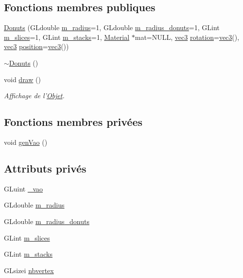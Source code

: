 \subsection*{Fonctions membres publiques}
\begin{DoxyCompactItemize}
\item 
\hyperlink{class_donuts_a91d8d9b011ed1f7e406a2906f2b6e898}{Donuts} (G\+Ldouble \hyperlink{class_donuts_ae3db8d4ea17228ed43d388bac7fb35b3}{m\+\_\+radius}=1, G\+Ldouble \hyperlink{class_donuts_a5050c790a74b5313a06b818a7f3e8723}{m\+\_\+radius\+\_\+donuts}=1, G\+Lint \hyperlink{class_donuts_a2214ac47effb92c5de33fa7c57d28694}{m\+\_\+slices}=1, G\+Lint \hyperlink{class_donuts_a5273bc3a4bdada5e4302b35d49bdd550}{m\+\_\+stacks}=1, \hyperlink{class_material}{Material} $\ast$mat=N\+U\+L\+L, \hyperlink{structvec3}{vec3} \hyperlink{class_objet_ac69a1b459bcb4433099c8cfbff06b209}{rotation}=\hyperlink{structvec3}{vec3}(), \hyperlink{structvec3}{vec3} \hyperlink{class_objet_a0e109bc790b14328202dd2546b04e2fd}{position}=\hyperlink{structvec3}{vec3}())
\item 
\hyperlink{class_donuts_aea6536802eeb29b4fa4eee2f7e1ea626}{$\sim$\+Donuts} ()
\item 
void \hyperlink{class_donuts_a5a7932c8494905ba09bb515a01e6c91d}{draw} ()
\begin{DoxyCompactList}\small\item\em Affichage de l'\hyperlink{class_objet}{Objet}. \end{DoxyCompactList}\end{DoxyCompactItemize}
\subsection*{Fonctions membres privées}
\begin{DoxyCompactItemize}
\item 
void \hyperlink{class_donuts_aff7950429cf43ee2898c6f1a6545b174}{gen\+Vao} ()
\end{DoxyCompactItemize}
\subsection*{Attributs privés}
\begin{DoxyCompactItemize}
\item 
G\+Luint \hyperlink{class_donuts_a659c70b043ddc2ebcdc64bcb58c1e621}{\+\_\+vao}
\item 
G\+Ldouble \hyperlink{class_donuts_ae3db8d4ea17228ed43d388bac7fb35b3}{m\+\_\+radius}
\item 
G\+Ldouble \hyperlink{class_donuts_a5050c790a74b5313a06b818a7f3e8723}{m\+\_\+radius\+\_\+donuts}
\item 
G\+Lint \hyperlink{class_donuts_a2214ac47effb92c5de33fa7c57d28694}{m\+\_\+slices}
\item 
G\+Lint \hyperlink{class_donuts_a5273bc3a4bdada5e4302b35d49bdd550}{m\+\_\+stacks}
\item 
G\+Lsizei \hyperlink{class_donuts_aac0118d276a512d287a9bc1f4c7d249d}{nbvertex}
\end{DoxyCompactItemize}
